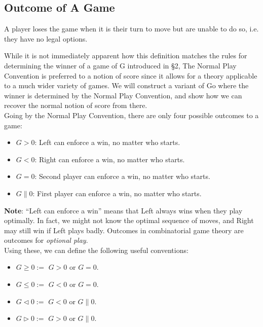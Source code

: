 \documentclass[../math194_paper.tex]{subfiles}
\begin{document}
\subsection{Outcome of A Game}

\begin{definition}
    A player loses the game when it is their turn to move but are unable to do so, i.e. they have
    no legal options.
\end{definition}
While it is not immediately apparent how this definition matches the rules
for determining the winner of a game of G introduced in \S 2, The Normal Play Convention
is preferred to a notion of score since it allows for a theory applicable 
to a much wider variety of games. We will construct a variant of Go where the winner 
is determined by the Normal Play Convention, and show how we can recover the normal notion of
score from there. \\

Going by the Normal Play Convention, there are only four possible outcomes to a game:
\begin{itemize}
    \item $G > 0$: Left can enforce a win, no matter who starts.
    \item $G < 0$: Right can enforce a win, no matter who starts.
    \item $G = 0$: Second player can enforce a win, no matter who starts.
    \item $G \parallel 0$: First player can enforce a win, no matter who starts.
\end{itemize}
\textbf{Note}:  ``Left can enforce a win'' means that Left always wins when they play optimally.
In fact, we might not know the optimal sequence of moves, and Right may still win if Left plays badly.
Outcomes in combinatorial game theory are outcomes for \textit{optional play}.\\

Using these, we can define the following useful conventions:
\begin{itemize}
    \item $G \geq 0 :=$ $G > 0$ or $G = 0$.
    \item $G \leq 0 :=$ $G < 0$ or $G = 0$.
    \item $G \triangleleft 0 :=$ $G < 0$ or $G \parallel 0$.
    \item $G \triangleright 0 :=$  $G > 0$ or $G \parallel 0$.
\end{itemize}
\end{document}
